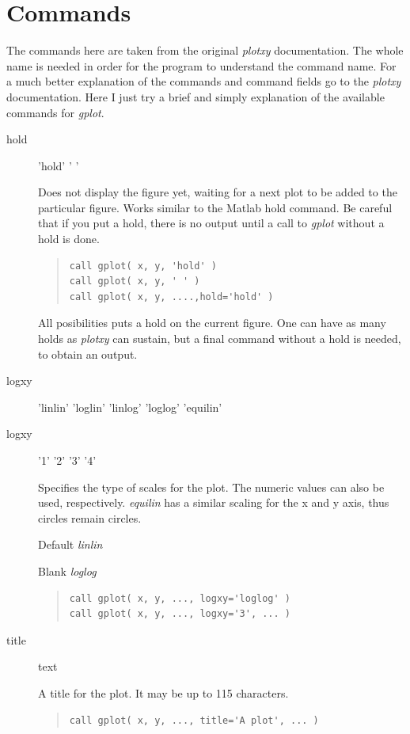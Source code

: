 \documentclass{article}
\begin{document}
\section{Commands}
The commands here are taken from the original {\it plotxy} documentation. The whole name is needed in order for the program to understand the command name. For a much better explanation of the commands and command fields go to the {\it plotxy} documentation. Here I just try a brief and simply explanation of the available commands for {\it gplot}. 
\begin{description}
\item[hold ] 'hold' ' '

Does not display the figure yet, waiting for a next plot to be added to the particular figure. Works similar to the Matlab hold command. Be careful that if you put a hold, there is no output until a call to {\it gplot} without a hold is done.
\begin{quote}
\begin{verbatim}
call gplot( x, y, 'hold' )
call gplot( x, y, ' ' )
call gplot( x, y, ....,hold='hold' )
\end{verbatim}
\end{quote}
All posibilities puts a hold on the current figure. One can have as many holds as {\it plotxy} can sustain, but a final command without a hold is needed, to obtain an output.

\item[logxy] 'linlin' 'loglin' 'linlog' 'loglog' 'equilin'
\item[logxy] '1' '2' '3' '4'

Specifies the type of scales for the plot. The numeric values can also be used, respectively. {\it equilin} has a similar scaling for the x and y axis, thus circles remain circles. 

Default {\it linlin}

Blank {\it loglog}
\begin{quote}
\begin{verbatim}
call gplot( x, y, ..., logxy='loglog' )
call gplot( x, y, ..., logxy='3', ... )
\end{verbatim}
\end{quote}

\item[title] text

A title for the plot. It may be up to 115 characters. 
\begin{quote}
\begin{verbatim}
call gplot( x, y, ..., title='A plot', ... )
\end{verbatim}
\end{quote}


\end{description}
\end{document}
